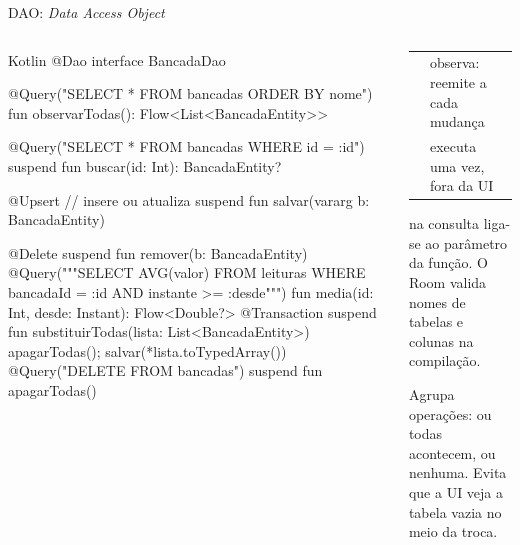 \documentclass[aspectratio=169,10pt]{beamer}
\begin{document}
\begin{frame}[fragile]{DAO: \emph{Data Access Object}}
  \begin{columns}[T]
    \begin{column}{0.56\textwidth}
\begin{codigo}[title=BancadaDao.kt]{Kotlin}
@Dao
interface BancadaDao {
  @Query("SELECT * FROM bancadas ORDER BY nome")
  fun observarTodas(): Flow<List<BancadaEntity>>

  @Query("SELECT * FROM bancadas WHERE id = :id")
  suspend fun buscar(id: Int): BancadaEntity?

  @Upsert                         // insere ou atualiza
  suspend fun salvar(vararg b: BancadaEntity)

  @Delete suspend fun remover(b: BancadaEntity)
  @Query("""SELECT AVG(valor) FROM leituras
    WHERE bancadaId = :id AND instante >= :desde""")
  fun media(id: Int, desde: Instant): Flow<Double?>
  @Transaction
  suspend fun substituirTodas(lista: List<BancadaEntity>) {
    apagarTodas(); salvar(*lista.toTypedArray())
  }
  @Query("DELETE FROM bancadas") suspend fun apagarTodas()
}
\end{codigo}
    \end{column}
    \begin{column}{0.42\textwidth}
      \scriptsize
      \begin{tabularx}{\linewidth}{@{}l L@{}}
        \toprule
         &  \\
        \midrule
         & observa: reemite a cada mudança \\
         & executa uma vez, fora da UI \\
        \bottomrule
      \end{tabularx}
      \begin{conceito}[Parâmetros]
         na consulta liga-se ao parâmetro  da função. O Room valida nomes de tabelas e colunas na compilação.
      \end{conceito}
      \begin{dica}
        Agrupa operações: ou todas acontecem, ou nenhuma. Evita que a UI veja a tabela vazia no meio da troca.
      \end{dica}
    \end{column}
  \end{columns}
\end{frame}
\end{document}

